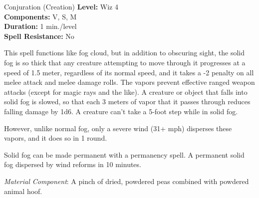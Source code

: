 {Conjuration (Creation)}
{
	\textbf{Level:}
	Wiz 4\\
	\textbf{Components:}
	V, S, M\\
	\textbf{Duration:}
	1 min./level\\
	\textbf{Spell Resistance:}
	No\\
}
{
	This spell functions like fog cloud, but in addition to obscuring sight, the solid fog is so thick that any creature attempting to move through it progresses at a speed of 1.5 meter, regardless of its normal speed, and it takes a -2 penalty on all melee attack and melee damage rolls. The vapors prevent effective ranged weapon attacks (except for magic rays and the like). A creature or object that falls into solid fog is slowed, so that each 3 meters of vapor that it passes through reduces falling damage by 1d6. A creature can't take a 5-foot step while in solid fog.

	However, unlike normal fog, only a severe wind (31+ mph) disperses these vapors, and it does so in 1 round.

	Solid fog can be made permanent with a permanency spell. A permanent solid fog dispersed by wind reforms in 10 minutes.

	\textit{Material Component}:
	A pinch of dried, powdered peas combined with powdered animal hoof.

}
